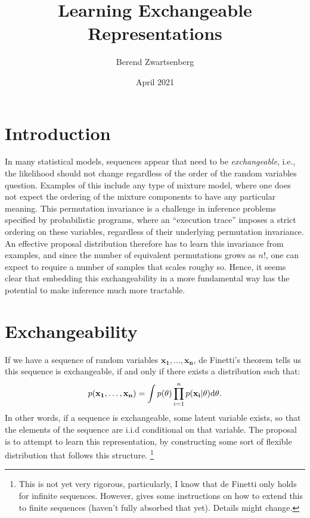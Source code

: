 \documentclass{article}
\title{Learning Exchangeable Representations}
\author{Berend Zwartsenberg }
\date{April 2021}
\begin{document}
\maketitle

\section{Introduction}
In many statistical models, sequences appear that need to be \emph{exchangeable}, i.e., the likelihood should not change regardless of the order of the random variables question. Examples of this include any type of mixture model, where one does not expect the ordering of the mixture components to have any particular meaning. This permutation invariance is a challenge in inference problems specified by probabilistic programs, where an ``execution trace'' imposes a strict ordering on these variables, regardless of their underlying permutation invariance. An effective proposal distribution therefore has to learn this invariance from examples, and since the number of equivalent permutations grows as $n!$, one can expect to require a number of samples that scales roughy so. Hence, it seems clear that embedding this exchangeability in a more fundamental way has the potential to make inference much more tractable. 

\section{Exchangeability}
If we have a sequence of random variables $\mathbf{x_1}, \dots, \mathbf{x_n}$, de Finetti's theorem tells us this sequence is exchangeable, if and only if there exists a distribution such that:
\[
\label{eq:definetti}
p(\mathbf{x_1}, \dots, \mathbf{x_n}) = \int p(\theta) \prod_{i=1}^n p(\mathbf{x_i} | \theta) \mathrm{d} \theta.
\]
In other words, if a sequence is exchangeable, some latent variable exists, so that the elements of the sequence are i.i.d conditional on that variable. The proposal is to attempt to learn this representation, by constructing some sort of flexible distribution that follows this structure. \footnote{This is not yet very rigorous, particularly, I know that de Finetti only holds for infinite sequences. However, \cite{Diaconis1980} gives some instructions on how to extend this to finite sequences (haven't fully absorbed that yet). Details might change.} 
\end{document}
